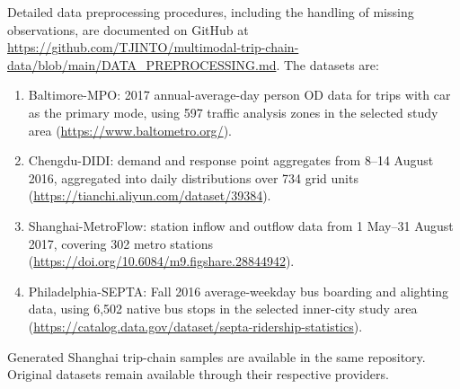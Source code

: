 Detailed data preprocessing procedures, including the handling of missing observations, are documented on GitHub at \url{https://github.com/TJINTO/multimodal-trip-chain-data/blob/main/DATA_PREPROCESSING.md}.
The datasets are:
\begin{enumerate}
  \item Baltimore-MPO: 2017 annual-average-day person OD data for trips with car as the primary mode, using 597 traffic analysis zones in the selected study area (\url{https://www.baltometro.org/}).
  \item Chengdu-DIDI: demand and response point aggregates from 8--14 August 2016, aggregated into daily distributions over 734 grid units (\url{https://tianchi.aliyun.com/dataset/39384}).
  \item Shanghai-MetroFlow: station inflow and outflow data from 1 May--31 August 2017, covering 302 metro stations (\url{https://doi.org/10.6084/m9.figshare.28844942}).
  \item Philadelphia-SEPTA: Fall 2016 average-weekday bus boarding and alighting data, using 6,502 native bus stops in the selected inner-city study area (\url{https://catalog.data.gov/dataset/septa-ridership-statistics}).
\end{enumerate}
Generated Shanghai trip-chain samples are available in the same repository. Original datasets remain available through their respective providers.
